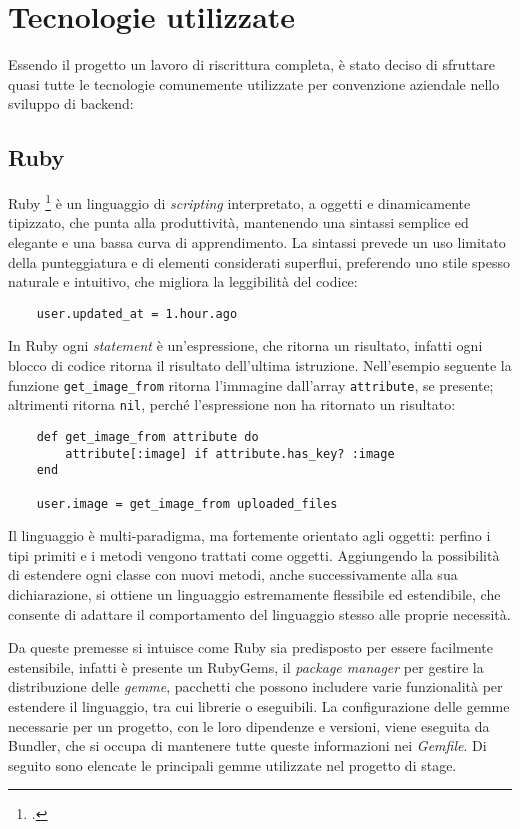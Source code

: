 \section{Tecnologie utilizzate}
Essendo il progetto un lavoro di riscrittura completa, è stato deciso di sfruttare quasi tutte le tecnologie comunemente utilizzate per convenzione aziendale nello sviluppo di backend:

\subsection{Ruby}
Ruby \footcite{site:ruby} è un linguaggio di \emph{scripting} interpretato, a oggetti e dinamicamente tipizzato, che punta alla produttività, mantenendo una sintassi semplice ed elegante e una bassa curva di apprendimento. La sintassi prevede un uso limitato della punteggiatura e di elementi considerati superflui, preferendo uno stile spesso naturale e intuitivo, che migliora la leggibilità del codice:
\begin{verbatim}
	user.updated_at = 1.hour.ago
\end{verbatim}

\noindent In Ruby ogni \emph{statement} è un'espressione, che ritorna un risultato, infatti ogni blocco di codice ritorna il risultato dell'ultima istruzione. Nell'esempio seguente la funzione \verb|get_image_from| ritorna l'immagine dall'array \verb|attribute|, se presente; altrimenti ritorna \verb|nil|, perché l'espressione non ha ritornato un risultato:
\begin{verbatim}
	def get_image_from attribute do
		attribute[:image] if attribute.has_key? :image
	end

	user.image = get_image_from uploaded_files
\end{verbatim}

\noindent Il linguaggio è multi-paradigma, ma fortemente orientato agli oggetti: perfino i tipi primiti e i metodi vengono trattati come oggetti. Aggiungendo la possibilità di estendere ogni classe con nuovi metodi, anche successivamente alla sua dichiarazione, si ottiene un linguaggio estremamente flessibile ed estendibile, che consente di adattare il comportamento del linguaggio stesso alle proprie necessità.

Da queste premesse si intuisce come Ruby sia predisposto per essere facilmente estensibile, infatti è presente un RubyGems, il \emph{package manager} per gestire la distribuzione delle \emph{gemme}, pacchetti che possono includere varie funzionalità per estendere il linguaggio, tra cui librerie o eseguibili. La configurazione delle gemme necessarie per un progetto, con le loro dipendenze e versioni, viene eseguita da Bundler, che si occupa di mantenere tutte queste informazioni nei \emph{Gemfile}. Di seguito sono elencate le principali gemme utilizzate nel progetto di stage.

